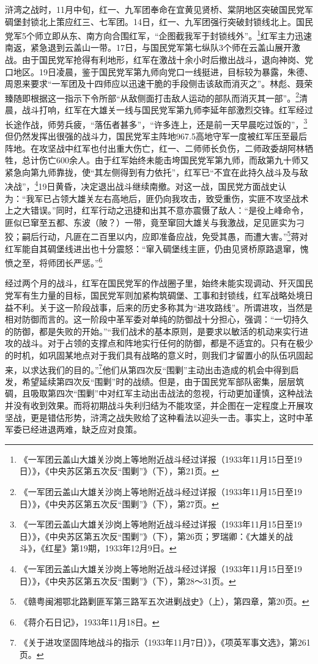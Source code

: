 浒湾之战时，11月中旬，红一、九军团奉命在宜黄见贤桥、棠阴地区突破国民党军碉堡封锁北上策应红三、七军团。14日，红一、九军团强行突破封锁线北上。国民党军5个师立即从东、南方向合围红军，“企图截我军于封锁线外”。\footnote{《一军团云盖山大雄关沙岗上等地附近战斗经过详报（1933年11月15日至19日）》，《中央苏区第五次反“围剿”》（下），第21页。}红军主力迅速南返，紧急退到云盖山一带。17日，与国民党军第七纵队3个师在云盖山展开激战。由于国民党军抢得有利地形，红军在激战十余小时后撤出战斗，退向神岗、党口地区。19日凌晨，鉴于国民党军第九师向党口一线挺进，目标较为暴露，朱德、周恩来要求“一军团及十四师应以迅速干脆的手段侧击该敌而消灭之”。林彪、聂荣臻随即根据这一指示下令所部“从敌侧面打击敌人运动的部队而消灭其一部”。\footnote{《一军团云盖山大雄关沙岗上等地附近战斗经过详报（1933年11月15日至19日）》，《中央苏区第五次反“围剿”》（下），第27页。}清晨，战斗打响，红军在大雄关一线与国民党军第九师李延年部激烈交锋。红军经过长途作战，师劳兵疲，“落伍者甚多”，“许多连上，还是前一天早晨吃过饭的”，\footnote{《一军团云盖山大雄关沙岗上等地附近战斗经过详报（1933年11月15日至19日）》，《中央苏区第五次反“围剿”》（下），第26页；罗瑞卿：《大雄关的战斗》，《红星》第19期，1933年12月9日。}但仍然发挥出很强的战斗力，国民党军主阵地967.5高地守军一度被红军压至最后阵地。在攻坚战中红军也付出重大伤亡，红一、二师师长负伤，二师政委胡阿林牺牲，总计伤亡600余人。由于红军始终未能击垮国民党军第九师，而敌第九十师又紧急向第九师靠拢，使“其左侧得到有力依托”，红军已“不宜在此持久战斗及与敌决战”，\footnote{《一军团云盖山大雄关沙岗上等地附近战斗经过详报（1933年11月15日至19日）》，《中央苏区第五次反“围剿”》（下），第28～31页。}19日黄昏，决定退出战斗继续南撤。对这一战，国民党方面战史认为：“我军已占领大雄关左右高地后，匪仍向我攻击，致受重伤，实匪不攻坚战术上之大错误。”同时，红军行动之迅捷和出其不意亦震慑了敌人：“是役上峰命令，匪似已窜至五都、东波（陂？）一带，竟至窜回大雄关与我激战，足见匪实为刁狡；嗣后行动，凡匪在二百里以内，应即准备应战，免受其愚，而遭大害。”\footnote{《赣粤闽湘鄂北路剿匪军第三路军五次进剿战史》（上），第四章，第20页。}蒋对红军能自其碉堡线进出也十分震怒：“窜入碉堡线主匪，仍由见贤桥原路退窜，愧愤之至，将师团长严惩。”\footnote{《蒋介石日记》，1933年11月18日。}


经过两个月的战斗，红军在国民党军的作战圈子里，始终未能实现调动、歼灭国民党军有生力量的目标，国民党军则加紧构筑碉堡、工事和封锁线，红军战略处境日益不利。关于这一阶段战事，后来的历史多称其为“进攻路线”。所谓进攻，当然是相对防御而言的。这一阶段中革军委对单纯的防御战十分担心，强调：“一切持久的防御，都是失败的开始。”“我们战术的基本原则，是要求以敏活的机动来实行进攻的战斗。对于占领的支撑点和阵地实行任何的防御，都是不适宜的。只有在极少的时机，如巩固某地点对于我们具有战略的意义时，则我们才留置小的队伍巩固起来，以求达我们的目的。”\footnote{《关于进攻坚固阵地战斗的指示（1933年11月7日）》，《项英军事文选》，第261页。}他们从第四次反“围剿”主动出击造成的机会中得到启发，希望延续第四次反“围剿”时的战绩。但是，由于国民党军部队密集，层层筑碉，且吸取第四次“围剿”中对红军主动出击战法的忽视，行动更加谨慎，这种战法并没有收到效果。而将初期战斗失利归结为不能攻坚，并企图在一定程度上开展攻坚战，更是错估形势，浒湾之战失败给了这种看法以迎头一击。事实上，这时中革军委已经进退两难，缺乏应对良策。


